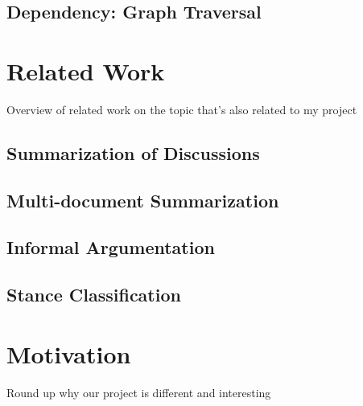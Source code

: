     \subsection{Dependency: Graph Traversal}
  \section{Related Work}
    Overview of related work on the topic that's also related to my project
    \subsection{Summarization of Discussions}
    \subsection{Multi-document Summarization}
    \subsection{Informal Argumentation}
    \subsection{Stance Classification}
  \section{Motivation}
    Round up why our project is different and interesting
